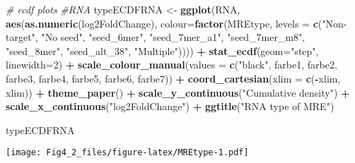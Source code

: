 \documentclass[
]{article}
\newenvironment{Shaded}{\begin{snugshade}}{\end{snugshade}}
\newcommand{\AttributeTok}[1]{\textcolor[rgb]{0.13,0.29,0.53}{#1}}
\newcommand{\CommentTok}[1]{\textcolor[rgb]{0.56,0.35,0.01}{\textit{#1}}}
\newcommand{\DecValTok}[1]{\textcolor[rgb]{0.00,0.00,0.81}{#1}}
\newcommand{\FunctionTok}[1]{\textcolor[rgb]{0.13,0.29,0.53}{\textbf{#1}}}
\newcommand{\NormalTok}[1]{#1}
\newcommand{\OtherTok}[1]{\textcolor[rgb]{0.56,0.35,0.01}{#1}}
\newcommand{\SpecialCharTok}[1]{\textcolor[rgb]{0.81,0.36,0.00}{\textbf{#1}}}
\newcommand{\StringTok}[1]{\textcolor[rgb]{0.31,0.60,0.02}{#1}}
\begin{document}
\begin{Shaded}
\begin{Highlighting}[]
\CommentTok{\# ecdf plots}
\CommentTok{\#RNA}
\NormalTok{typeECDFRNA }\OtherTok{\textless{}{-}} \FunctionTok{ggplot}\NormalTok{(RNA, }\FunctionTok{aes}\NormalTok{(}\FunctionTok{as.numeric}\NormalTok{(log2FoldChange), }
                              \AttributeTok{colour=}\FunctionTok{factor}\NormalTok{(MREtype, }\AttributeTok{levels =} \FunctionTok{c}\NormalTok{(}\StringTok{"Non{-}target"}\NormalTok{, }\StringTok{"No seed"}\NormalTok{, }\StringTok{"seed\_6mer"}\NormalTok{, }\StringTok{"seed\_7mer\_a1"}\NormalTok{, }\StringTok{"seed\_7mer\_m8"}\NormalTok{, }\StringTok{"seed\_8mer"}\NormalTok{, }\StringTok{"seed\_alt\_38"}\NormalTok{, }\StringTok{"Multiple"}\NormalTok{)))) }\SpecialCharTok{+} 
  \FunctionTok{stat\_ecdf}\NormalTok{(}\AttributeTok{geom=}\StringTok{"step"}\NormalTok{, }\AttributeTok{linewidth=}\DecValTok{2}\NormalTok{) }\SpecialCharTok{+}
  \FunctionTok{scale\_colour\_manual}\NormalTok{(}\AttributeTok{values =} \FunctionTok{c}\NormalTok{(}\StringTok{"black"}\NormalTok{, farbe1, farbe2, farbe3, farbe4, farbe5, farbe6, farbe7)) }\SpecialCharTok{+}
  \FunctionTok{coord\_cartesian}\NormalTok{(}\AttributeTok{xlim =} \FunctionTok{c}\NormalTok{(}\SpecialCharTok{{-}}\NormalTok{xlim, xlim)) }\SpecialCharTok{+} 
  \FunctionTok{theme\_paper}\NormalTok{() }\SpecialCharTok{+}
  \FunctionTok{scale\_y\_continuous}\NormalTok{(}\StringTok{"Cumulative density"}\NormalTok{) }\SpecialCharTok{+} \FunctionTok{scale\_x\_continuous}\NormalTok{(}\StringTok{"log2FoldChange"}\NormalTok{) }\SpecialCharTok{+}
  \FunctionTok{ggtitle}\NormalTok{(}\StringTok{"RNA type of MRE"}\NormalTok{)}

\NormalTok{typeECDFRNA}
\end{Highlighting}
\end{Shaded}

\texttt{[image: Fig4\_2\_files/figure-latex/MREtype-1.pdf]}
\end{document}
